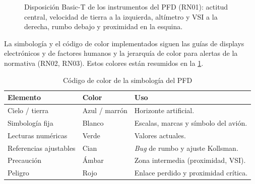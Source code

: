 \begin{figure}[H]
    \centering
    \caption{Disposición Basic-T de los instrumentos del PFD (RN01): actitud
             central, velocidad de tierra a la izquierda, altímetro y VSI a la
             derecha, rumbo debajo y proximidad en la esquina.}
    \label{fig:basict_layout}
\end{figure}

La simbología y el código de color implementados siguen las guías de displays electrónicos y
de factores humanos \cite{sae_as8034c, hfstd001b} y la jerarquía de color para
alertas de la normativa \cite{cfr25_1321, cfr25_1322} (RN02, RN03). Estos colores están resumidos en
la \cref{tab:sw_colores}.

\begin{table}[H]
    \centering
    \caption{Código de color de la simbología del PFD}
    \label{tab:sw_colores}
    \begin{tabularx}{\linewidth}{l l X}
        \toprule
        \textbf{Elemento} & \textbf{Color} & \textbf{Uso} \\
        \midrule
        Cielo / tierra          & Azul / marrón & Horizonte artificial. \\
        Simbología fija         & Blanco        & Escalas, marcas y símbolo del avión. \\
        Lecturas numéricas      & Verde         & Valores actuales. \\
        Referencias ajustables  & Cian          & \textit{Bug} de rumbo y ajuste Kollsman. \\
        Precaución              & Ámbar         & Zona intermedia (proximidad, VSI). \\
        Peligro                 & Rojo          & Enlace perdido y proximidad crítica. \\
        \bottomrule
    \end{tabularx}
\end{table}


